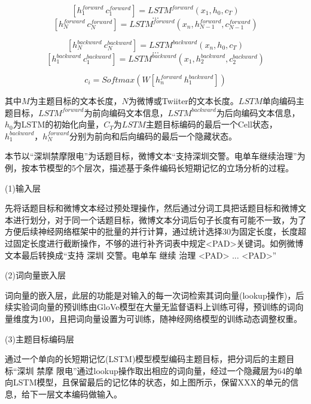 \begin{equation}\label{lstm_f}[h^{forward}_{1}~c^{forward}_{1}] = LSTM^{forward}(x_1,h_0,c_T)\end{equation}
$$...$$
\begin{equation}\label{lstm_f}[h^{forward}_{N}~c^{forward}_{N}] = LSTM^{forward}(x_n,h^{forward}_{N-1},c^{forward}_{N-1})\end{equation}

\begin{equation}\label{lstm_f}[h^{backward}_{N}~c^{backward}_{N}] = LSTM^{backward}(x_n,h_0,c_T)\end{equation}
$$...$$
\begin{equation}\label{lstm_f}[h^{backward}_{1}~c^{backward}_{1}] = LSTM^{backward}(x_1,h^{backward}_{2},c^{backward}_{2})\end{equation}

\begin{equation}\label{lstm_f}c_i=Softmax(W[h^{forward}_n~h^{backward}_1])\end{equation}

其中$M$为主题目标的文本长度，$N$为微博或Twiiter的文本长度。$LSTM$单向编码主题目标，$LSTM^{forward}$为前向编码文本信息，$LSTM^{backward}$为后向编码文本信息，$h_0$为LSTM的初始化向量，$C_T$为$LSTM$主题目标编码的最后一个Cell状态，$h^{backward}_{1}，h^{forward}_{N}$分别为前向和后向编码的最后一个隐藏状态。

本节以“深圳禁摩限电”为话题目标，微博文本“支持深圳交警。电单车继续治理”为例，按本节模型的5个层次，描述基于条件编码长短期记忆的立场分析的过程。

(1)输入层

先将话题目标和微博文本经过预处理操作，然后通过分词工具把话题目标和微博文本进行划分，对于同一个话题目标，微博文本分词后句子长度有可能不一致，为了方便后续神经网络框架中的批量的并行计算，通过统计选择30为固定长度，长度超过固定长度进行截断操作，不够的进行补齐词表中规定<PAD>关键词。如例微博文本最后转换成“支持 深圳 交警。电单车 继续 治理 <PAD> ... <PAD>”

(2)词向量嵌入层

词向量的嵌入层，此层的功能是对输入的每一次词检索其词向量(lookup操作)，后续实验词向量的预训练由GloVe模型在大量无监督语料上训练可得，预训练的词向量维度为100，且把词向量设置为可训练，随神经网络模型的训练动态调整权重。

(3)主题目标编码层

通过一个单向的长短期记忆(LSTM)模型模型编码主题目标，把分词后的主题目标“深圳 禁摩 限电”通过lookup操作取出相应的词向量，经过一个隐藏层为64的单向LSTM模型，且保留最后的记忆体的状态，如上图所示，保留XXX的单元的信息，给下一层文本编码做输入。

